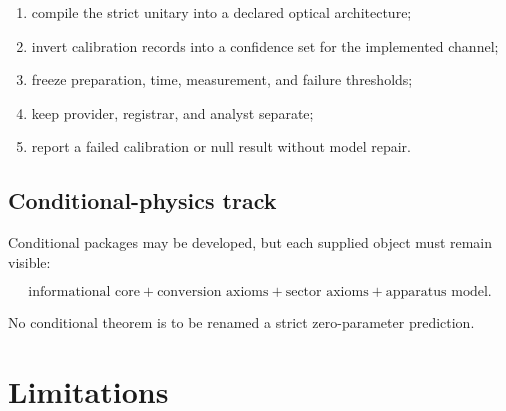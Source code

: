 \documentclass[11pt,a4paper,openany]{report}
\begin{document}
\begin{enumerate}
\item 
compile the strict unitary into a declared optical architecture;

\item 
invert calibration records into a confidence set for the implemented channel;

\item 
freeze preparation, time, measurement, and failure thresholds;

\item 
keep provider, registrar, and analyst separate;

\item 
report a failed calibration or null result without model repair.

\end{enumerate}

\section{Conditional-physics track}

Conditional packages may be developed, but each supplied object must remain visible:

\[
\text{informational core}
+\text{conversion axioms}
+\text{sector axioms}
+\text{apparatus model}.
\]

No conditional theorem is to be renamed a strict zero-parameter prediction.

\chapter{Limitations}
\end{document}
